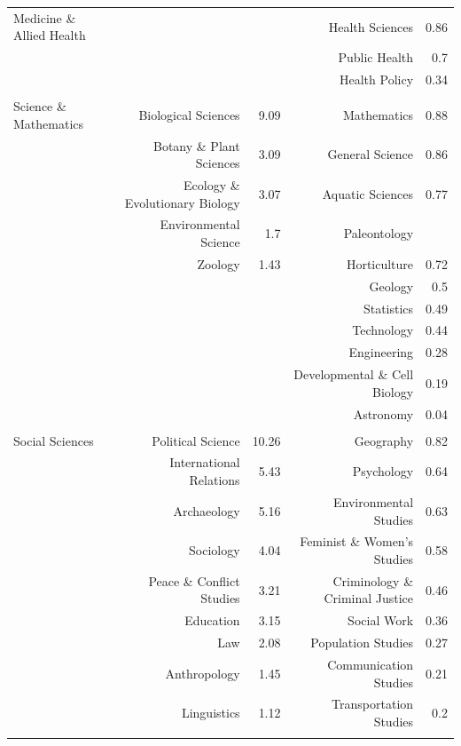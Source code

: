 \documentclass[]{book}
\theoremstyle{definition}
\theoremstyle{definition}
\theoremstyle{definition}
\theoremstyle{remark}
\begin{document}
\begin{table}[!htbp]
\begin{tabular}{@{\extracolsep{5pt}} lrrrr}
Medicine \& Allied Health &  &  & Health Sciences & 0.86 \\ 
 &  &  & Public Health & 0.7 \\ 
 &  &  & Health Policy & 0.34 \\ 
 &  &  &  &  \\ 
Science \& Mathematics & Biological Sciences & 9.09 & Mathematics & 0.88 \\ 
 & Botany \& Plant Sciences & 3.09 & General Science & 0.86 \\ 
 & Ecology \& Evolutionary Biology & 3.07 & Aquatic Sciences & 0.77 \\ 
 & Environmental Science & 1.7 & Paleontology &  \\ 
 & Zoology & 1.43 & Horticulture & 0.72 \\ 
 &  &  & Geology & 0.5 \\ 
 &  &  & Statistics & 0.49 \\ 
 &  &  & Technology & 0.44 \\ 
 &  &  & Engineering & 0.28 \\ 
 &  &  & Developmental \& Cell Biology & 0.19 \\ 
 &  &  & Astronomy & 0.04 \\ 
 &  &  &  &  \\ 
Social Sciences & Political Science & 10.26 & Geography & 0.82 \\ 
 & International Relations & 5.43 & Psychology & 0.64 \\ 
 & Archaeology & 5.16 & Environmental Studies & 0.63 \\ 
 & Sociology & 4.04 & Feminist \& Women's Studies & 0.58 \\ 
 & Peace \& Conflict Studies & 3.21 & Criminology \& Criminal Justice & 0.46 \\ 
 & Education & 3.15 & Social Work & 0.36 \\ 
 & Law & 2.08 & Population Studies & 0.27 \\ 
 & Anthropology & 1.45 & Communication Studies & 0.21 \\ 
 & Linguistics & 1.12 & Transportation Studies & 0.2 \\ 
\hline \\[-1.8ex] 
\end{tabular} 
\end{table}
\end{document}
